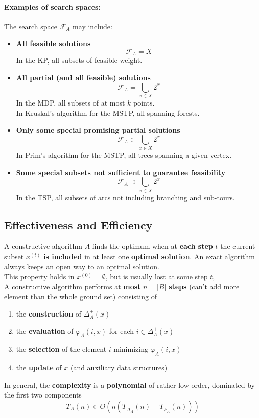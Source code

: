 \paragraph{Examples of search spaces:} The search space $\mathcal{F}_A$ may include:
\begin{itemize}
	\item \textbf{All feasible solutions}
	$$ \mathcal{F}_A = X $$
	In the KP, all subsets of feasible weight.\\
	
	\item \textbf{All partial (and all feasible) solutions}
	$$ \mathcal{F}_A = \bigcup_{x \in X} 2^x $$
	In the MDP, all subsets of at most $k$ points.\\
	In Kruskal's algorithm for the MSTP, all spanning forests.\\
	
	\item \textbf{Only some special promising partial solutions}
	$$ \mathcal{F}_A \subset \bigcup_{x \in X} 2^x $$
	In Prim's algorithm for the MSTP, all trees spanning a given vertex.\\
	
	\item \textbf{Some special subsets not sufficient to guarantee feasibility}
	$$ \mathcal{F}_A \supset \bigcup_{x \in X} 2^x $$
	In the TSP, all subsets of arcs not including branching and sub-tours.\\
\end{itemize}

\newpage

\subsection{Effectiveness and Efficiency}
A constructive algorithm $A$ finds the optimum when at \textbf{each step} $t$ the current subset $x^{(t)}$ \textbf{is included} in at least one \textbf{optimal solution}. An exact algorithm always keeps an open way to an optimal solution.\\
This property holds in $x^{(0)} = \emptyset$, but is usually lost at some step $t$,\\

A constructive algorithm performs at \textbf{most} $n = |B|$ \textbf{steps} (can't add more element than the whole ground set) consisting of 
\begin{enumerate}
	\item the \textbf{construction} of $\Delta_A^+ (x)$
	\item the \textbf{evaluation} of $\varphi_A (i,x)$ for each $i \in \Delta_A^+(x)$
	\item the \textbf{selection} of the element $i$ minimizing $\varphi_A (i,x)$
	\item the \textbf{update} of $x$ (and auxiliary data structures)
\end{enumerate}
In general, the \textbf{complexity} is a \textbf{polynomial} of rather low order, dominated by the first two components
$$ T_A (n) \in O\left(n \left(T_{\Delta_A^+} (n) + T_{\varphi_A} (n)\right)\right) $$

